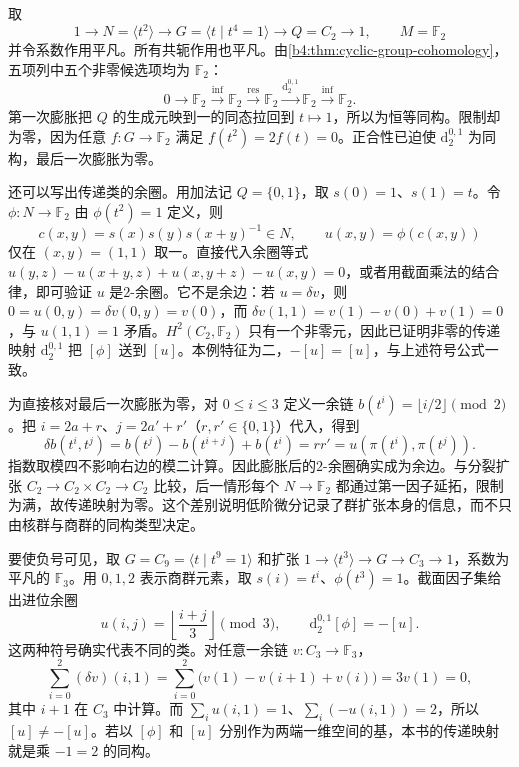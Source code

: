 取
\[
	1\longrightarrow N=\langle t^2\rangle\longrightarrow G=\langle t\mid t^4=1\rangle\longrightarrow Q=C_2\longrightarrow1, \qquad M=\mathbb F_2
\]
并令系数作用平凡。所有共轭作用也平凡。由\cref{b4:thm:cyclic-group-cohomology}，五项列中五个非零候选项均为 \(\mathbb F_2\)：
\[
	0\longrightarrow\mathbb F_2\xrightarrow{\mathrm{inf}} \mathbb F_2\xrightarrow{\mathrm{res}}\mathbb F_2 \xrightarrow{\mathrm d_2^{0,1}}\mathbb F_2 \xrightarrow{\mathrm{inf}}\mathbb F_2.
\]
第一次膨胀把 \(Q\) 的生成元映到一的同态拉回到 \(t\mapsto1\)，所以为恒等同构。限制却为零，因为任意 \(f:G\to\mathbb F_2\) 满足 \(f(t^2)=2f(t)=0\)。正合性已迫使 \(\mathrm d_2^{0,1}\) 为同构，最后一次膨胀为零。

\ProseParagraphBreak
还可以写出传递类的余圈。用加法记 \(Q=\{0,1\}\)，取 \(s(0)=1\)、\(s(1)=t\)。令 \(\phi:N\to\mathbb F_2\) 由 \(\phi(t^2)=1\) 定义，则
\[
	c(x,y)=s(x)s(y)s(x+y)^{-1}\in N, \qquad u(x,y)=\phi(c(x,y))
\]
仅在 \((x,y)=(1,1)\) 取一。直接代入余圈等式 \(u(y,z)-u(x+y,z)+u(x,y+z)-u(x,y)=0\)，或者用截面乘法的结合律，即可验证 \(u\) 是\(2\)-余圈。它不是余边：若 \(u=\delta v\)，则 \(0=u(0,y)=\delta v(0,y)=v(0)\)，而 \(\delta v(1,1)=v(1)-v(0)+v(1)=0\)，与 \(u(1,1)=1\) 矛盾。\(H^2(C_2,\mathbb F_2)\) 只有一个非零元，因此已证明非零的传递映射 \(\mathrm d_2^{0,1}\) 把 \([\phi]\) 送到 \([u]\)。本例特征为二，\(-[u]=[u]\)，与上述符号公式一致。

\ProseParagraphBreak
为直接核对最后一次膨胀为零，对 \(0\le i\le3\) 定义一余链 \(b(t^i)=\lfloor i/2\rfloor\pmod2\)。把 \(i=2a+r\)、\(j=2a'+r'\)（\(r,r'\in\{0,1\}\)）代入，得到
\[
	\delta b(t^i,t^j)=b(t^j)-b(t^{i+j})+b(t^i)=rr' =u(\pi(t^i),\pi(t^j)).
\]
指数取模四不影响右边的模二计算。因此膨胀后的\(2\)-余圈确实成为余边。与分裂扩张 \(C_2\to C_2\times C_2\to C_2\) 比较，后一情形每个 \(N\to\mathbb F_2\) 都通过第一因子延拓，限制为满，故传递映射为零。这个差别说明低阶微分记录了群扩张本身的信息，而不只由核群与商群的同构类型决定。

\ProseParagraphBreak
要使负号可见，取 \(G=C_9=\langle t\mid t^9=1\rangle\) 和扩张 \(1\to\langle t^3\rangle\to G\to C_3\to1\)，系数为平凡的 \(\mathbb F_3\)。用 \(0,1,2\) 表示商群元素，取 \(s(i)=t^i\)、\(\phi(t^3)=1\)。截面因子集给出进位余圈
\[
	u(i,j)=\left\lfloor\frac{i+j}{3}\right\rfloor\pmod3, \qquad \mathrm d_2^{0,1}[\phi]=-[u].
\]
这两种符号确实代表不同的类。对任意一余链 \(v:C_3\to\mathbb F_3\)，
\[
	\sum_{i=0}^{2}(\delta v)(i,1) =\sum_{i=0}^{2}\bigl(v(1)-v(i+1)+v(i)\bigr) =3v(1)=0,
\]
其中 \(i+1\) 在 \(C_3\) 中计算。而 \(\sum_i u(i,1)=1\)、\(\sum_i(-u(i,1))=2\)，所以 \([u]\ne-[u]\)。若以 \([\phi]\) 和 \([u]\) 分别作为两端一维空间的基，本书的传递映射就是乘 \(-1=2\) 的同构。
